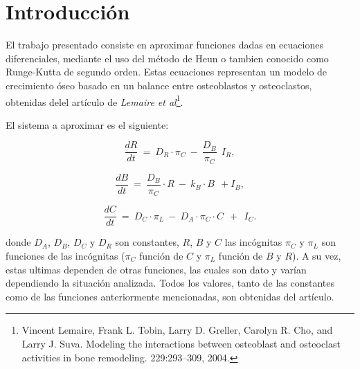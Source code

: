 \documentclass[a4paper]{article}
\begin{document}





\section{Introducción}

El trabajo presentado consiste en aproximar funciones dadas en ecuaciones diferenciales, mediante el uso del método de Heun o tambien conocido como Runge-Kutta de segundo orden. Estas ecuaciones representan un modelo de crecimiento óseo basado en un balance entre osteoblastos y osteoclastos, obtenidas delel artículo de \textit{Lemaire et al}\footnote{Vincent Lemaire, Frank L. Tobin, Larry D. Greller, Carolyn R. Cho, and
Larry J. Suva. Modeling the interactions between osteoblast and osteoclast
activities in bone remodeling. 229:293–309, 2004.}.

El sistema a aproximar es el siguiente:

\begin{equation}
\frac{dR}{dt} \ = \ D_R \cdot {\pi}_{C} \ - \ \frac{D_B}{{\pi}_{C}} \ \ {I}_{R},
\end{equation}

\begin{equation}
\frac{dB}{dt} \ = \ \frac{D_B}{{\pi}_{C}} \cdot R \ - \ k_B \cdot B \ \ + {I}_{B},
\end{equation}

\begin{equation}
\frac{dC}{dt} \ = \ D_C \cdot {\pi}_{L} \ - \ D_A \cdot	{\pi}_{C} \cdot C \ \ + \ \ {I}_{C}.
\end{equation}

donde ${D}_{A}$, ${D}_{B}$, ${D}_{C}$ y ${D}_{R}$ son constantes, $R$, $B$ y $C$ las incógnitas ${\pi}_{C}$ y ${\pi}_{L}$ son funciones de las incógnitas (${\pi}_{C} $ función de $ C $ y $ {\pi}_{L} $ función de $B$ y $R$). A su vez, estas ultimas dependen de otras funciones, las cuales son dato y varían dependiendo la situación analizada. Todos los valores, tanto de las constantes como de las funciones anteriormente mencionadas, son obtenidas del artículo.
\end{document}
